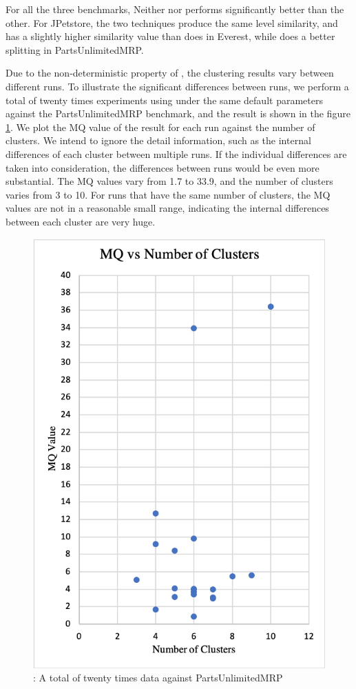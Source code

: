 For all the three benchmarks, Neither \bn nor \fs performs significantly better than the other. For JPetstore, the two techniques produce the same level similarity, and \bn has a slightly higher similarity value than \fs does in Everest, while \fs does a better splitting in PartsUnlimitedMRP.

Due to the non-deterministic property of \bn, the clustering results vary between different runs. To illustrate the significant differences between runs, we perform a total of twenty times experiments using \bn under the same default parameters against the PartsUnlimitedMRP benchmark, and the result is shown in the figure \ref{fig:mq-vs-num-of-cluster-plot}. We plot the MQ value of the result for each run against the number of clusters. We intend to ignore the detail information, such as the internal differences of each cluster between multiple runs. If the individual differences are taken into consideration, the differences between runs would be even more substantial. The MQ values vary from 1.7 to 33.9, and the number of clusters varies from 3 to 10. For runs that have the same number of clusters, the MQ values are not in a reasonable small range, indicating the internal differences between each cluster are very huge.

\begin{figure}
    \centering
    \includegraphics[width=0.8\columnwidth]{images/mq-vs-num-of-cluster-plot.png}
    \caption{\bn: A total of twenty times data against PartsUnlimitedMRP }
    \label{fig:mq-vs-num-of-cluster-plot}
\end{figure}

